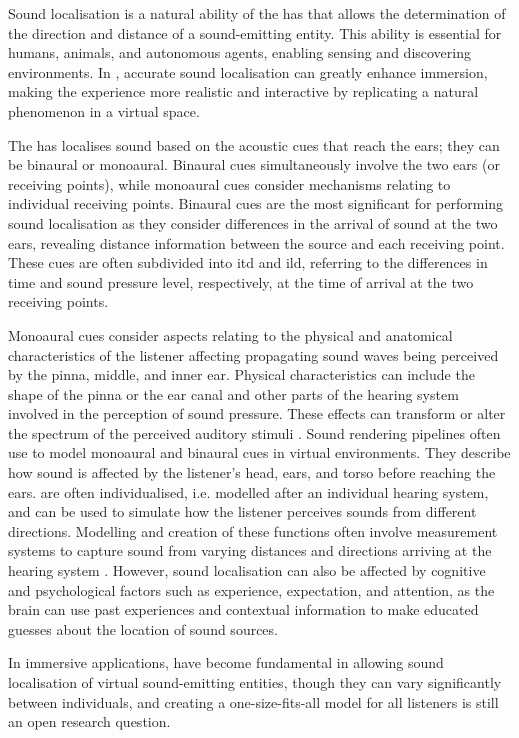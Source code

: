 Sound localisation is a natural ability of the \acrshort{has} that allows the determination of the direction and distance of a sound-emitting entity. This ability is essential for humans, animals, and autonomous agents, enabling sensing and discovering environments. In , accurate sound localisation can greatly enhance immersion, making the experience more realistic and interactive by replicating a natural phenomenon in a virtual space.\par
The \acrshort{has} localises sound based on the acoustic cues that reach the ears; they can be binaural or monoaural. Binaural cues simultaneously involve the two ears (or receiving points), while monoaural cues consider mechanisms relating to individual receiving points. Binaural cues are the most significant for performing sound localisation as they consider differences in the arrival of sound at the two ears, revealing distance information between the source and each receiving point. These cues are often subdivided into \acrfull{itd} and \acrfull{ild}, referring to the differences in time and sound pressure level, respectively, at the time of arrival at the two receiving points.\par
Monoaural cues consider aspects relating to the physical and anatomical characteristics of the listener affecting propagating sound waves being perceived by the pinna, middle, and inner ear. Physical characteristics can include the shape of the pinna or the ear canal and other parts of the hearing system involved in the perception of sound pressure. These effects can transform or alter the spectrum of the perceived auditory stimuli \citep{blauert1997spatial, howard2013acoustics}.
Sound rendering pipelines often use  to model monoaural and binaural cues in virtual environments. They describe how sound is affected by the listener's head, ears, and torso before reaching the ears.  are often individualised, i.e. modelled after an individual hearing system, and can be used to simulate how the listener perceives sounds from different directions. Modelling and creation of these functions often involve measurement systems to capture sound from varying distances and directions arriving at the hearing system \citep{zotkin2003hrtf}. However, sound localisation can also be affected by cognitive and psychological factors such as experience, expectation, and attention, as the brain can use past experiences and contextual information to make educated guesses about the location of sound sources.\par
In immersive applications,  have become fundamental in allowing sound localisation of virtual sound-emitting entities, though they can vary significantly between individuals, and creating a one-size-fits-all model for all listeners is still an open research question.

